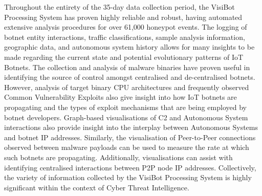 Throughout the entirety of the 35-day data collection period, the VisiBot Processing System has proven highly reliable and robust, having automated extensive analysis procedures for over 61,000 honeypot events. The logging of botnet entity interactions, traffic classifications, sample analysis information, geographic data, and autonomous system history allows for many insights to be made regarding the current state and potential evolutionary patterns of IoT Botnets. The collection and analysis of malware binaries have proven useful in identifying the source of control amongst centralised and de-centralised botnets. However, analysis of target binary CPU architectures and frequently observed Common Vulnerability Exploits also give insight into how IoT botnets are propagating and the types of exploit mechanisms that are being employed by botnet developers. Graph-based visualisations of C2 and Autonomous System interactions also provide insight into the interplay between Autonomous Systems and botnet IP addresses. Similarly, the visualisation of Peer-to-Peer connections observed between malware payloads can be used to measure the rate at which such botnets are propagating. Additionally, visualisations can assist with identifying centralised interactions between P2P node IP addresses. Collectively, the variety of information collected by the VisiBot Processing System is highly significant within the context of Cyber Threat Intelligence.